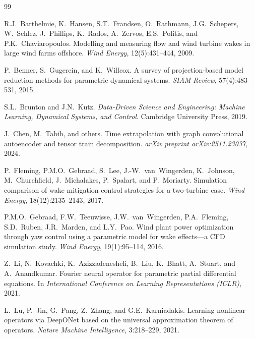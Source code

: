 \documentclass[12pt]{article}
\begin{document}
\begin{thebibliography}{99}

R.J.~Barthelmie, K.~Hansen, S.T.~Frandsen, O.~Rathmann, J.G.~Schepers, W.~Schlez, J.~Phillips, K.~Rados, A.~Zervos, E.S.~Politis, and P.K.~Chaviaropoulos.
\newblock Modelling and measuring flow and wind turbine wakes in large wind farms offshore.
\newblock \emph{Wind Energy}, 12(5):431--444, 2009.

P.~Benner, S.~Gugercin, and K.~Willcox.
\newblock A survey of projection-based model reduction methods for parametric dynamical systems.
\newblock \emph{SIAM Review}, 57(4):483--531, 2015.

S.L.~Brunton and J.N.~Kutz.
\newblock \emph{Data-Driven Science and Engineering: Machine Learning, Dynamical Systems, and Control}.
\newblock Cambridge University Press, 2019.

J.~Chen, M.~Tabib, and others.
\newblock Time extrapolation with graph convolutional autoencoder and tensor train decomposition.
\newblock \emph{arXiv preprint arXiv:2511.23037}, 2024.

P.~Fleming, P.M.O.~Gebraad, S.~Lee, J.-W.~van~Wingerden, K.~Johnson, M.~Churchfield, J.~Michalakes, P.~Spalart, and P.~Moriarty.
\newblock Simulation comparison of wake mitigation control strategies for a two-turbine case.
\newblock \emph{Wind Energy}, 18(12):2135--2143, 2017.

P.M.O.~Gebraad, F.W.~Teeuwisse, J.W.~van~Wingerden, P.A.~Fleming, S.D.~Ruben, J.R.~Marden, and L.Y.~Pao.
\newblock Wind plant power optimization through yaw control using a parametric model for wake effects---a {CFD} simulation study.
\newblock \emph{Wind Energy}, 19(1):95--114, 2016.

Z.~Li, N.~Kovachki, K.~Azizzadenesheli, B.~Liu, K.~Bhatt, A.~Stuart, and A.~Anandkumar.
\newblock Fourier neural operator for parametric partial differential equations.
\newblock In \emph{International Conference on Learning Representations (ICLR)}, 2021.

L.~Lu, P.~Jin, G.~Pang, Z.~Zhang, and G.E.~Karniadakis.
\newblock Learning nonlinear operators via {DeepONet} based on the universal approximation theorem of operators.
\newblock \emph{Nature Machine Intelligence}, 3:218--229, 2021.


\end{thebibliography}
\end{document}
